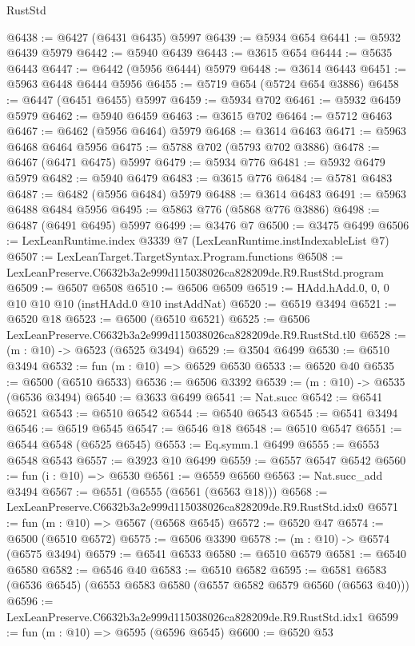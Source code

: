 \begin{lexlean}{RustStd}
\begin{coremodule}
@6438 := @6427 (@6431 @6435) @5997
@6439 := @5934 @654
@6441 := @5932 @6439 @5979
@6442 := @5940 @6439
@6443 := @3615 @654
@6444 := @5635 @6443
@6447 := @6442 (@5956 @6444) @5979
@6448 := @3614 @6443
@6451 := @5963 @6448 @6444 @5956
@6455 := @5719 @654 (@5724 @654 @3886)
@6458 := @6447 (@6451 @6455) @5997
@6459 := @5934 @702
@6461 := @5932 @6459 @5979
@6462 := @5940 @6459
@6463 := @3615 @702
@6464 := @5712 @6463
@6467 := @6462 (@5956 @6464) @5979
@6468 := @3614 @6463
@6471 := @5963 @6468 @6464 @5956
@6475 := @5788 @702 (@5793 @702 @3886)
@6478 := @6467 (@6471 @6475) @5997
@6479 := @5934 @776
@6481 := @5932 @6479 @5979
@6482 := @5940 @6479
@6483 := @3615 @776
@6484 := @5781 @6483
@6487 := @6482 (@5956 @6484) @5979
@6488 := @3614 @6483
@6491 := @5963 @6488 @6484 @5956
@6495 := @5863 @776 (@5868 @776 @3886)
@6498 := @6487 (@6491 @6495) @5997
@6499 := @3476 @7
@6500 := @3475 @6499
@6506 := LexLeanRuntime.index @3339 @7 (LexLeanRuntime.instIndexableList @7)
@6507 := LexLeanTarget.TargetSyntax.Program.functions
@6508 := LexLeanPreserve.C6632b3a2e999d115038026ca828209de.R9.RustStd.program
@6509 := @6507 @6508
@6510 := @6506 @6509
@6519 := HAdd.hAdd.{0, 0, 0} @10 @10 @10 (instHAdd.{0} @10 instAddNat)
@6520 := @6519 @3494
@6521 := @6520 @18
@6523 := @6500 (@6510 @6521)
@6525 := @6506 LexLeanPreserve.C6632b3a2e999d115038026ca828209de.R9.RustStd.tl0
@6528 := (m : @10) -> @6523 (@6525 @3494)
@6529 := @3504 @6499
@6530 := @6510 @3494
@6532 := fun (m : @10) => @6529 @6530
@6533 := @6520 @40
@6535 := @6500 (@6510 @6533)
@6536 := @6506 @3392
@6539 := (m : @10) -> @6535 (@6536 @3494)
@6540 := @3633 @6499
@6541 := Nat.succ
@6542 := @6541 @6521
@6543 := @6510 @6542
@6544 := @6540 @6543
@6545 := @6541 @3494
@6546 := @6519 @6545
@6547 := @6546 @18
@6548 := @6510 @6547
@6551 := @6544 @6548 (@6525 @6545)
@6553 := Eq.symm.{1} @6499
@6555 := @6553 @6548 @6543
@6557 := @3923 @10 @6499
@6559 := @6557 @6547 @6542
@6560 := fun (i : @10) => @6530
@6561 := @6559 @6560
@6563 := Nat.succ_add @3494
@6567 := @6551 (@6555 (@6561 (@6563 @18)))
@6568 := LexLeanPreserve.C6632b3a2e999d115038026ca828209de.R9.RustStd.idx0
@6571 := fun (m : @10) => @6567 (@6568 @6545)
@6572 := @6520 @47
@6574 := @6500 (@6510 @6572)
@6575 := @6506 @3390
@6578 := (m : @10) -> @6574 (@6575 @3494)
@6579 := @6541 @6533
@6580 := @6510 @6579
@6581 := @6540 @6580
@6582 := @6546 @40
@6583 := @6510 @6582
@6595 := @6581 @6583 (@6536 @6545) (@6553 @6583 @6580 (@6557 @6582 @6579 @6560 (@6563 @40)))
@6596 := LexLeanPreserve.C6632b3a2e999d115038026ca828209de.R9.RustStd.idx1
@6599 := fun (m : @10) => @6595 (@6596 @6545)
@6600 := @6520 @53

\end{coremodule}
\end{lexlean}
